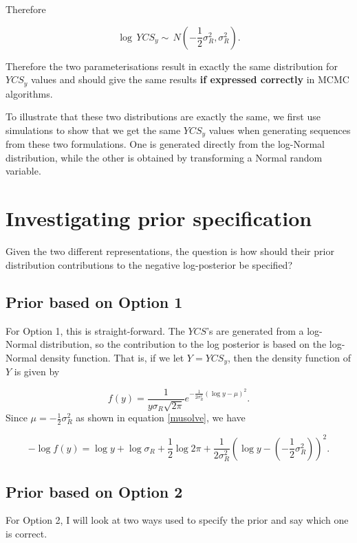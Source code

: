 \begin{appendices}
Therefore

\[\log\, YCS_y \sim \,N\left(-\frac{1}{2}\sigma^2_R, \sigma^2_R\right).\]

Therefore the two parameterisations result in exactly the same
distribution for \(YCS_y\) values and should give the same results
\textbf{if expressed correctly} in MCMC algorithms.

To illustrate that these two distributions are exactly the same, we
first use simulations to show that we get the same \(YCS_y\) values when
generating sequences from these two formulations. One is generated
directly from the log-Normal distribution, while the other is obtained
by transforming a Normal random variable.

\section*{Investigating prior
	specification}\label{investigating-prior-specification}

Given the two different representations, the question is how should
their prior distribution contributions to the negative log-posterior be
specified?

\subsection*{Prior based on Option 1}\label{prior-based-on-option-1}

For Option 1, this is straight-forward. The \(YCS\)'s are generated from
a log-Normal distribution, so the contribution to the log posterior is
based on the log-Normal density function. That is, if we let
\(Y=YCS_y\), then the density function of \(Y\) is given by

\[f(y)= \frac{1}{y\sigma_R\sqrt{2\pi}}e^{-\frac{1}{2\sigma_R^2}(\log y -\mu)^2}.\]
Since \(\mu = -\frac{1}{2}\sigma^2_R\) as shown in equation
\ref{musolve}, we have

\begin{equation}
-\log f(y)= \log y + \log \sigma_R + \frac{1}{2}\log 2\pi + \frac{1}{2\sigma_R^2}\left(\log y - (-\frac{1}{2}\sigma^2_R)\right)^2.
\label{logfy}
\end{equation}

\subsection*{Prior based on Option 2}\label{prior-based-on-option-2}

For Option 2, I will look at two ways used to specify the prior and say
which one is correct.


\end{appendices}
